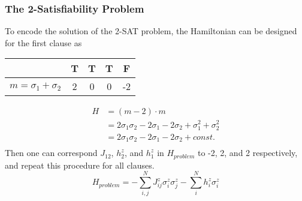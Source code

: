 \documentclass{beamer}
\begin{document}
\begin{frame}
	\frametitle{The 2-Satisfiability Problem}
	
	To encode the solution of the 2-SAT problem, the Hamiltonian can be designed for the first clause as 
	\begin{center}
		\begin{tabular}{|c|c|c|c|c|}
			
			\hline
			& T & T & T & F \\
			\hline
			\hline
			$m=\sigma_1+\sigma_2$ & 2 & 0 & 0 & -2 \\
			\hline
		\end{tabular} 
	\end{center}
	\begin{equation*}
	\begin{split}
	H & = (m-2) \cdot m\\
	& = 2\sigma_1 \sigma_2 -2\sigma_1 -2\sigma_2 + \sigma_1^2 + \sigma_2^2\\
	& = 2\sigma_1 \sigma_2 -2\sigma_1 -2\sigma_2 + const.\\
	\end{split}
	\end{equation*}
	Then one can correspond  $J_{12}$, $h_2^z$, and $h_1^z$ in $H_{problem}$ to -2, 2, and 2 respectively, and repeat this procedure for all clauses. 
	\begin{equation*}
	H_{problem}= -\sum_{i,j}^N J_{ij}^z \sigma^z_i \sigma^z_j - \sum_{i}^N h_i^z \sigma^z_i
	\end{equation*} 
	
	
\end{frame}

\end{document}
